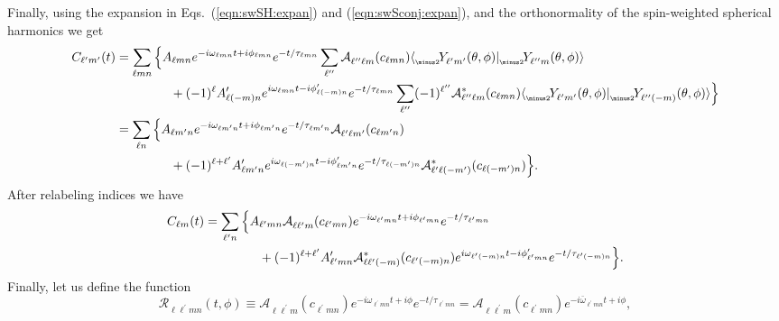 \documentclass[11pt]{article}
\newcommand{\braket}[2]{\langle #1|#2\rangle}
\newcommand{\swY}[4][]{{}_{{}_{#2}}\!Y^{#1}_{#3}(#4)}
\newcommand{\YSH}[3][]{\mathcal{A}^{#1}_{#2}(#3)}
\begin{document}
\noindent
Finally, using the expansion in Eqs.~(\ref{eqn:swSH:expan}) and (\ref{eqn:swSconj:expan}), and
the orthonormality of the spin-weighted spherical harmonics we get
\begin{equation}
\begin{aligned} \label{clm:eq3}
C_{\ell^\prime{m}^\prime}(t) & = \sum_{\ell{m}n} \Big\{ 
   A_{\ell{m}n} e^{-i\omega_{\ell{m}n}t+i\phi_{\ell{m}n}}e^{-t/\tau_{\ell{m}n}}
    \sum_{\ell^{\prime\prime}} \YSH{\ell^{\prime\prime}\ell{m}}{c_{\ell{m}n}}
    \braket{\swY{\minus 2}{\ell^\prime{m}^\prime}{\theta,\phi}}{\swY{\minus 2}{\ell^{\prime\prime}m}{\theta,\phi}} \\
& {} \hspace{0.6in}
  + (-1)^\ell A^\prime_{\ell(-m)n} e^{i\omega_{\ell{m}n}t-i\phi^\prime_{\ell(-m)n}}e^{-t/\tau_{\ell{m}n}}
    \sum_{\ell^{\prime\prime}} (-1)^{\ell^{\prime\prime}} \YSH[*]{\ell^{\prime\prime}\ell{m}}{c_{\ell{m}n}}
    \braket{\swY{\minus 2}{\ell^\prime{m}^\prime}{\theta,\phi}}{\swY{\minus 2}{\ell^{\prime\prime}(-m)}{\theta,\phi}} \Big\} \\ 
 & = \sum_{\ell{n}} \Big\{ 
   A_{\ell{m^\prime}n} e^{-i\omega_{\ell{m^\prime}n}t+i\phi_{\ell{m^\prime}n}}e^{-t/\tau_{\ell{m^\prime}n}}
    \YSH{\ell^\prime\ell{m^\prime}}{c_{\ell{m^\prime}n}} \\
& {} \hspace{0.6in}
  + (-1)^{\ell+\ell^\prime}A^\prime_{\ell{m^\prime}n} e^{i\omega_{\ell(-m^\prime)n}t-i\phi^\prime_{\ell{m^\prime}n}}e^{-t/\tau_{\ell(-m^\prime)n}}
    \YSH[*]{\ell^\prime\ell(-m^\prime)}{c_{\ell(-m^\prime)n}} \Big\}.
\end{aligned}
\end{equation}
After relabeling indices we have
\begin{equation}\label{eq:SphericalKerrModes}
\begin{aligned}
 C_{\ell{m}}(t) & = \sum_{\ell^\prime{n}} \Big\{ 
   A_{\ell^\prime{m}n}\YSH{\ell\ell^\prime{m}}{c_{\ell^\prime{m}n}}
    e^{-i\omega_{\ell^\prime{m}n}t+i\phi_{\ell^\prime{m}n}}e^{-t/\tau_{\ell^\prime{m}n}} \\
& {} \hspace{0.6in}
  + (-1)^{\ell+\ell^\prime} A^\prime_{\ell^\prime{m}n}
    \YSH[*]{\ell\ell^\prime(-m)}{c_{\ell^\prime(-m)n}}
    e^{i\omega_{\ell^\prime(-m)n}t-i\phi^\prime_{\ell^\prime{m}n}}e^{-t/\tau_{\ell^\prime(-m)n}} \Big\}.
\end{aligned}
\end{equation}
Finally, let us define the function
\begin{equation}
  \mathcal{R}_{\ell\ell^\prime{m}n}(t,\phi) \equiv 
    \YSH{\ell\ell^\prime{m}}{c_{\ell^\prime{m}n}}
    e^{-i\omega_{\ell^\prime{m}n}t+i\phi}e^{-t/\tau_{\ell^\prime{m}n}}
    = \YSH{\ell\ell^\prime{m}}{c_{\ell^\prime{m}n}}e^{-i\bar\omega_{\ell^\prime{m}n}t+i\phi},
\end{equation}
\end{document}
